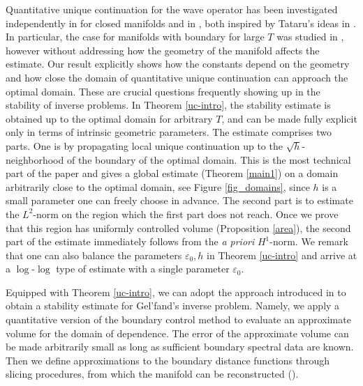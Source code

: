 \documentclass[11pt,letterpaper]{amsart}
\numberwithin{equation}{section}
\theoremstyle{definition}
\theoremstyle{plain}
\theoremstyle{definition}
\theoremstyle{plain}
\theoremstyle{definition}
\theoremstyle{plain}
\begin{document}
Quantitative unique continuation for the wave operator has been investigated independently in \cite{BKL2,BKL1} for closed manifolds and in \cite{LL}, both inspired by Tataru's ideas in \cite{Tataru-preprint}.
In particular, the case for manifolds with boundary for large $T$ was studied in \cite{LL}, however without addressing how the geometry of the manifold affects the estimate.
Our result explicitly shows how the constants depend on the geometry and how close the domain of quantitative unique continuation can approach the optimal domain.
These are crucial questions frequently showing up in the stability of inverse problems.
In Theorem \ref{uc-intro}, the stability estimate is obtained up to the optimal domain for arbitrary $T$, and can be made fully explicit only in terms of intrinsic geometric parameters.
The estimate comprises two parts. One is by propagating local unique continuation up to the $\sqrt{h}$-neighborhood of the boundary of the optimal domain. This is the most technical part of the paper and gives a global estimate (Theorem \ref{main1}) on a domain arbitrarily close to the optimal domain, see Figure \ref{fig_domains}, since $h$ is a small parameter one can freely choose in advance.
The second part is to estimate the $L^2$-norm on the region which the first part does not reach.
Once we prove that this region has uniformly controlled volume (Proposition \ref{area}), the second part of the estimate immediately follows from the \emph{a priori} $H^1$-norm.
We remark that one can also balance the parameters $\varepsilon_0,h$ in Theorem \ref{uc-intro} and arrive at a $\log$-$\log$ type of estimate with a single parameter $\varepsilon_0$.



Equipped with Theorem \ref{uc-intro}, we can adopt the approach introduced in \cite{KKL0} to obtain a stability estimate for Gel'fand's inverse problem. Namely, we apply a quantitative version of the boundary control method to evaluate an approximate volume for the domain of dependence. The error of the approximate volume can be made arbitrarily small as long as sufficient boundary spectral data are known. Then we define approximations to the boundary distance functions through slicing procedures, from which the manifold can be reconstructed (\cite{KKL2}).
\end{document}
